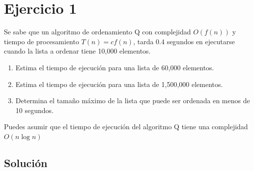 \section{Ejercicio 1}

\begin{tcolorbox}[enunciado]
Se sabe que un algoritmo de ordenamiento Q con complejidad $O(f(n))$ y tiempo de procesamiento $T(n)=cf(n)$, tarda 0.4 segundos en ejecutarse cuando la lista a ordenar tiene 10,000 elementos.
\begin{enumerate}
    \item Estima el tiempo de ejecución para una lista de 60,000 elementos.
    \item Estima el tiempo de ejecución para una lista de 1,500,000 elementos.
    \item Determina el tamaño máximo de la lista que puede ser ordenada en menos de 10 segundos.
\end{enumerate}
Puedes asumir que el tiempo de ejecución del algoritmo Q tiene una complejidad $O(n \log n)$
\end{tcolorbox}

\subsection{Solución}

